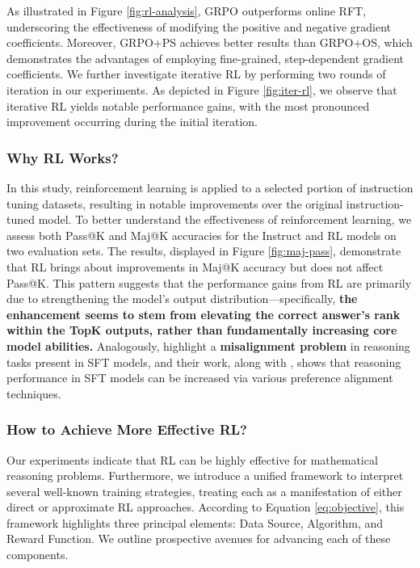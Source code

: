 \begin{itemize}[topsep=0pt]
As illustrated in Figure \ref{fig:rl-analysis}, GRPO outperforms online RFT, underscoring the effectiveness of modifying the positive and negative gradient coefficients. Moreover, GRPO+PS achieves better results than GRPO+OS, which demonstrates the advantages of employing fine-grained, step-dependent gradient coefficients. We further investigate iterative RL by performing two rounds of iteration in our experiments. As depicted in Figure \ref{fig:iter-rl}, we observe that iterative RL yields notable performance gains, with the most pronounced improvement occurring during the initial iteration.

\subsubsection{Why RL Works?} In this study, reinforcement learning is applied to a selected portion of instruction tuning datasets, resulting in notable improvements over the original instruction-tuned model. To better understand the effectiveness of reinforcement learning, we assess both Pass@K and Maj@K accuracies for the Instruct and RL models on two evaluation sets. The results, displayed in Figure \ref{fig:maj-pass}, demonstrate that RL brings about improvements in Maj@K accuracy but does not affect Pass@K. This pattern suggests that the performance gains from RL are primarily due to strengthening the model’s output distribution—specifically, \textbf{the enhancement seems to stem from elevating the correct answer's rank within the TopK outputs, rather than fundamentally increasing core model abilities.} Analogously, \citep{wang2023making} highlight a \textbf{misalignment problem} in reasoning tasks present in SFT models, and their work, along with \citep{yuan2023rrhf,song2023preference,wang2023making}, shows that reasoning performance in SFT models can be increased via various preference alignment techniques.

\subsubsection{How to Achieve More Effective RL?}
\label{sec:effec_rl}
Our experiments indicate that RL can be highly effective for mathematical reasoning problems. Furthermore, we introduce a unified framework to interpret several well-known training strategies, treating each as a manifestation of either direct or approximate RL approaches. According to Equation \ref{eq:objective}, this framework highlights three principal elements: Data Source, Algorithm, and Reward Function. We outline prospective avenues for advancing each of these components.


\end{itemize}
